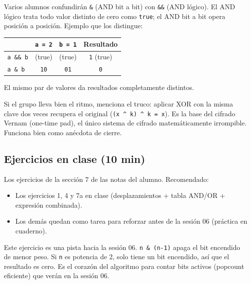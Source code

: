 \documentclass[12pt, oneside]{article}
\begin{document}
\begin{notaprofesor}
  Varios alumnos confundirán \texttt{\&} (AND bit a bit) con \texttt{\&\&}
  (AND lógico). El AND lógico trata todo valor distinto de cero como
  \texttt{true}; el AND bit a bit opera posición a posición. Ejemplo
  que los distingue:
  \begin{center}
  \begin{tabular}{lccc}
    & \texttt{a = 2} & \texttt{b = 1} & Resultado \\
    \hline
    \texttt{a \&\& b} & (true) & (true) & \texttt{1} (true) \\
    \texttt{a \& b}   & \texttt{10} & \texttt{01} & \texttt{0} \\
  \end{tabular}
  \end{center}
  El mismo par de valores da resultados completamente distintos.
\end{notaprofesor}

\begin{notaprofesor}
  Si el grupo lleva bien el ritmo, menciona el truco: aplicar XOR con
  la misma clave dos veces recupera el original (\texttt{(x \^{} k) \^{} k = x}).
  Es la base del cifrado Vernam (one-time pad), el único sistema de cifrado
  matemáticamente irrompible. Funciona bien como anécdota de cierre.
\end{notaprofesor}

\subsection{Ejercicios en clase (10 min)}

Los ejercicios de la sección 7 de las notas del alumno. Recomendado:
\begin{itemize}
  \item Los ejercicios 1, 4 y 7a en clase (desplazamientos + tabla AND/OR
        + expresión combinada).
  \item Los demás quedan como tarea para reforzar antes de la sesión 06
        (práctica en cuaderno).
\end{itemize}

\begin{notaprofesor}
  Este ejercicio es una pista hacia la sesión 06. \texttt{n \& (n-1)}
  apaga el bit encendido de menor peso. Si \texttt{n} es potencia de 2,
  solo tiene un bit encendido, así que el resultado es cero.
  Es el corazón del algoritmo para contar bits activos (popcount eficiente)
  que verán en la sesión 06.
\end{notaprofesor}
\end{document}
